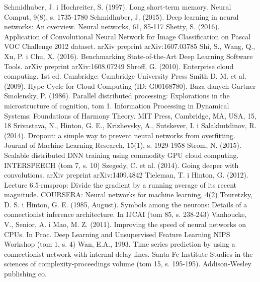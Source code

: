 \documentclass[12pt,a4paper,twoside]{article}
\begin{document}
\begin{thebibliography}{99}
 Schmidhuber, J. i Hochreiter, S. (1997). Long short-term memory. Neural Comput, 9(8), s. 1735-1780
 Schmidhuber, J. (2015). Deep learning in neural networks: An overview. Neural networks, 61, 85-117
 Shetty, S. (2016).  Application of Convolutional Neural Network for Image Classification on Pascal VOC Challenge 2012 dataset. arXiv preprint arXiv:1607.03785
 Shi, S., Wang, Q., Xu, P. i Chu, X. (2016). Benchmarking State-of-the-Art Deep Learning Software Tools. arXiv preprint arXiv:1608.07249
 Shroff, G. (2010). Enterprise cloud computing. 1st ed. Cambridge: Cambridge University Press
 Smith D. M. et al. (2009). Hype Cycle for Cloud Computing (ID: G00168780). Baza danych Gartner
 Smolensky, P. (1986). Parallel distributed processing: Explorations in the microstructure of cognition, tom 1. Information Processing in Dynamical Systems: Foundations of Harmony Theory. MIT Press, Cambridge, MA, USA, 15, 18
 Srivastava, N., Hinton, G. E., Krizhevsky, A., Sutskever, I. i Salakhutdinov, R. (2014). Dropout: a simple way to prevent neural networks from overfitting. Journal of Machine Learning Research, 15(1), s. 1929-1958
 Strom, N. (2015). Scalable distributed DNN training using commodity GPU cloud computing. INTERSPEECH (tom 7, s. 10)
 Szegedy, C. et al. (2014). Going deeper with convolutions. arXiv preprint arXiv:1409.4842
 Tieleman, T. i Hinton, G. (2012). Lecture 6.5-rmsprop: Divide the gradient by a running average of its recent magnitude. COURSERA: Neural networks for machine learning, 4(2)
 Touretzky, D. S. i Hinton, G. E. (1985, August). Symbols among the neurons: Details of a connectionist inference architecture. In IJCAI (tom 85, s. 238-243)
 Vanhoucke, V., Senior, A. i Mao, M. Z. (2011). Improving the speed of neural networks on CPUs. In Proc. Deep Learning and Unsupervised Feature Learning NIPS Workshop (tom 1, s. 4)
 Wan, E.A., 1993. Time series prediction by using a connectionist network with internal delay lines. Santa Fe Institute Studies in the sciences of complexity-proceedings volume (tom 15, s. 195-195). Addison-Wesley publishing co.

\end{thebibliography}
\end{document}
